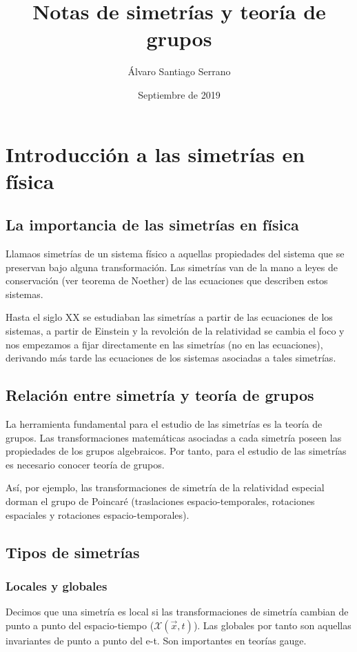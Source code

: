 \documentclass{article}
\title{Notas de simetrías y teoría de grupos}
\author{Álvaro Santiago Serrano }
\date{Septiembre de 2019}
\begin{document}
\maketitle

\section{Introducción a las simetrías en física}
\subsection{La importancia de las simetrías en física}

Llamaos simetrías de un sistema físico a aquellas propiedades del sistema que se preservan bajo alguna transformación. Las simetrías van de la mano a leyes de conservación (ver teorema de Noether) de las ecuaciones que describen estos sistemas.

Hasta el siglo XX se estudiaban las simetrías a partir de las ecuaciones de los sistemas, a partir de Einstein y la revolción de la relatividad se cambia el foco y nos empezamos a fijar directamente en las simetrías (no en las ecuaciones), derivando más tarde las ecuaciones de los sistemas asociadas a tales simetrías.

\subsection{Relación entre simetría y teoría de grupos}

La herramienta fundamental para el estudio de las simetrías es la teoría de grupos. Las transformaciones matemáticas asociadas a cada simetría poseen las propiedades de los grupos algebraicos. Por tanto, para el estudio de las simetrías es necesario conocer teoría de grupos.

Así, por ejemplo, las transformaciones de simetría de la relatividad especial dorman el grupo de Poincaré (traslaciones espacio-temporales, rotaciones espaciales y rotaciones espacio-temporales).

\subsection{Tipos de simetrías}

\subsubsection{Locales y globales}
Decimos que una simetría es local si las transformaciones de simetría cambian de punto a punto del espacio-tiempo ($\mathcal{X}(\Vec{x},t)$). Las globales por tanto son aquellas invariantes de punto a punto del e-t. Son importantes en teorías gauge.
\end{document}
